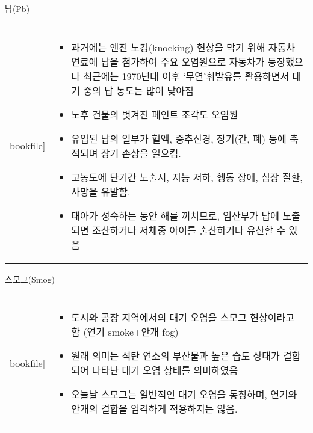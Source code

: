 \begin{frame}[t]{납(Pb)	}
	\begin{tabular}{ll}
		\begin{minipage}[t]{0.3\textwidth}\scriptsize
			\begin{figure}[t]
				\texttt{[image: \\bookfile]}
			\end{figure}
		\end{minipage}	
		&
		\begin{minipage}[t]{0.65\textwidth} \scriptsize	
			\begin{itemize}
				\item 과거에는 엔진 노킹(knocking) 현상을 막기 위해 자동차 연료에 납을 첨가하여 주요 오염원으로 자동차가 등장했으나 최근에는 1970년대 이후 ‘무연’휘발유를 활용하면서 대기 중의 납 농도는 많이 낮아짐
				\item 노후 건물의 벗겨진 페인트 조각도 오염원
				\item 유입된 납의 일부가 혈액, 중추신경, 장기(간, 폐) 등에 축적되며 장기 손상을 일으킴.
				\item 고농도에 단기간 노출시, 지능 저하, 행동 장애, 심장 질환, 사망을 유발함. 
				\item 태아가 성숙하는 동안 해를 끼치므로, 임산부가 납에 노출되면 조산하거나 저체중 아이를  출산하거나 유산할 수 있음
				
			\end{itemize}

		\end{minipage}
	\end{tabular}
\end{frame}





\begin{frame}[t]{스모그(Smog)}
	\begin{tabular}{ll}
		\begin{minipage}[t]{0.3\textwidth}\scriptsize
			\begin{figure}[t]
				\texttt{[image: \\bookfile]}
			\end{figure}
		\end{minipage}	
		&
		\begin{minipage}[t]{0.65\textwidth} \scriptsize	
			\begin{itemize}
				\item 도시와 공장 지역에서의 대기 오염을 스모그 현상이라고 함 (연기 smoke+안개 fog)
				\item 원래 의미는 석탄 연소의 부산물과 높은 습도 상태가 결합되어 나타난 대기 오염 상태를  의미하였음
				\item 오늘날 스모그는 일반적인 대기 오염을 통칭하며, 연기와 안개의 결합을 엄격하게 적용하지는 않음.
				
				
			\end{itemize}

		\end{minipage}
	\end{tabular}
\end{frame}



